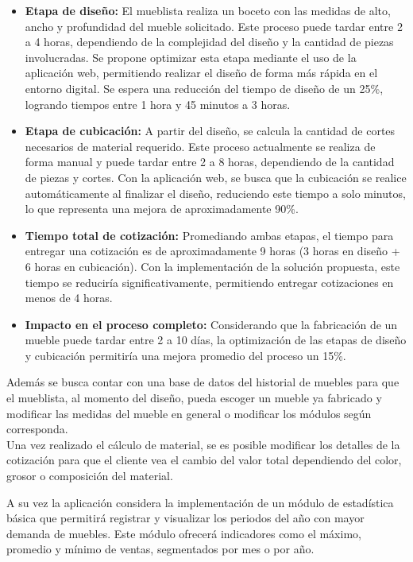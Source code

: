 ﻿\documentclass{iccmemoria}
\begin{document}
\begin{itemize}
    \item \textbf{Etapa de diseño:} El mueblista realiza un boceto con las medidas de alto, ancho y profundidad del mueble solicitado. Este proceso puede tardar entre 2 a 4 horas, dependiendo de la complejidad del diseño y la cantidad de piezas involucradas. Se propone optimizar esta etapa mediante el uso de la aplicación web, permitiendo realizar el diseño de forma más rápida en el entorno digital. Se espera una reducción del tiempo de diseño de un 25\%, logrando tiempos entre 1 hora y 45 minutos a 3 horas.

    \item \textbf{Etapa de cubicación:} A partir del diseño, se calcula la cantidad de cortes necesarios de material requerido. Este proceso actualmente se realiza de forma manual y puede tardar entre 2 a 8 horas, dependiendo de la cantidad de piezas y cortes. Con la aplicación web, se busca que la cubicación se realice automáticamente al finalizar el diseño, reduciendo este tiempo a solo minutos, lo que representa una mejora de aproximadamente 90\%.

    \item \textbf{Tiempo total de cotización:} Promediando ambas etapas, el tiempo para entregar una cotización es de aproximadamente 9 horas (3 horas en diseño + 6 horas en cubicación). Con la implementación de la solución propuesta, este tiempo se reduciría significativamente, permitiendo entregar cotizaciones en menos de 4 horas.

    \item \textbf{Impacto en el proceso completo:} Considerando que la fabricación de un mueble puede tardar entre 2 a 10 días, la optimización de las etapas de diseño y cubicación permitiría una mejora promedio del proceso un 15\%.
\end{itemize}

Además se busca contar con una base de datos del historial de muebles para que el mueblista, al momento del diseño, pueda escoger un mueble ya fabricado y modificar las medidas del mueble en general o modificar los módulos según corresponda.\\

Una vez realizado el cálculo de material, se es posible modificar los detalles de la cotización para que el cliente vea el cambio del valor total dependiendo del color, grosor o composición del material.

A su vez la aplicación considera la implementación de un módulo de estadística básica que permitirá registrar y visualizar los periodos del año con mayor demanda de muebles. Este módulo ofrecerá indicadores como el máximo, promedio y mínimo de ventas, segmentados por mes o por año.
\end{document}
